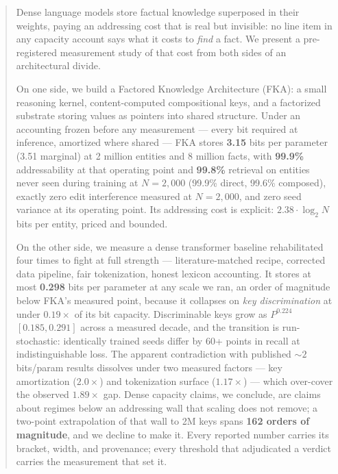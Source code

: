 \begin{abstract}
\noindent
Dense language models store factual knowledge superposed in their weights, paying an addressing cost
that is real but invisible: no line item in any capacity account says what it costs to \emph{find} a
fact. We present a pre-registered measurement study of that cost from both sides of an architectural
divide.

On one side, we build a Factored Knowledge Architecture (FKA): a small reasoning kernel,
content-computed compositional keys, and a factorized substrate storing values as pointers into
shared structure. Under an accounting frozen before any measurement --- every bit required at
inference, amortized where shared --- FKA stores \textbf{3.15} bits per parameter (3.51 marginal) at
2 million entities and 8 million facts, with \textbf{99.9\%} addressability at that operating point
and \textbf{99.8\%} retrieval on entities never seen during training at $N = 2{,}000$
(99.9\% direct, 99.6\% composed), exactly zero edit interference measured at $N = 2{,}000$, and zero
seed variance at its operating point. Its addressing cost is explicit:
$2.38 \cdot \log_2 N$ bits per entity, priced and bounded.

On the other side, we measure a dense transformer baseline rehabilitated four times to fight at full
strength --- literature-matched recipe, corrected data pipeline, fair tokenization, honest lexicon
accounting. It stores at most \textbf{0.298} bits per parameter at any scale we ran, an order of
magnitude below FKA's measured point, because it collapses on \emph{key discrimination} at under
$0.19\times$ of its bit capacity. Discriminable keys grow as $P^{0.224}$ $[0.185, 0.291]$ across a
measured decade, and the transition is run-stochastic: identically trained seeds differ by 60+ points
in recall at indistinguishable loss. The apparent contradiction with published ${\sim}2$ bits/param
results dissolves under two measured factors --- key amortization ($2.0\times$) and tokenization
surface ($1.17\times$) --- which over-cover the observed $\mathbf{1.89\times}$ gap. Dense capacity
claims, we conclude, are claims about regimes below an addressing wall that scaling does not remove;
a two-point extrapolation of that wall to 2M keys spans \textbf{162 orders of magnitude}, and we
decline to make it. Every reported number carries its bracket, width, and provenance; every threshold
that adjudicated a verdict carries the measurement that set it.
\end{abstract}
